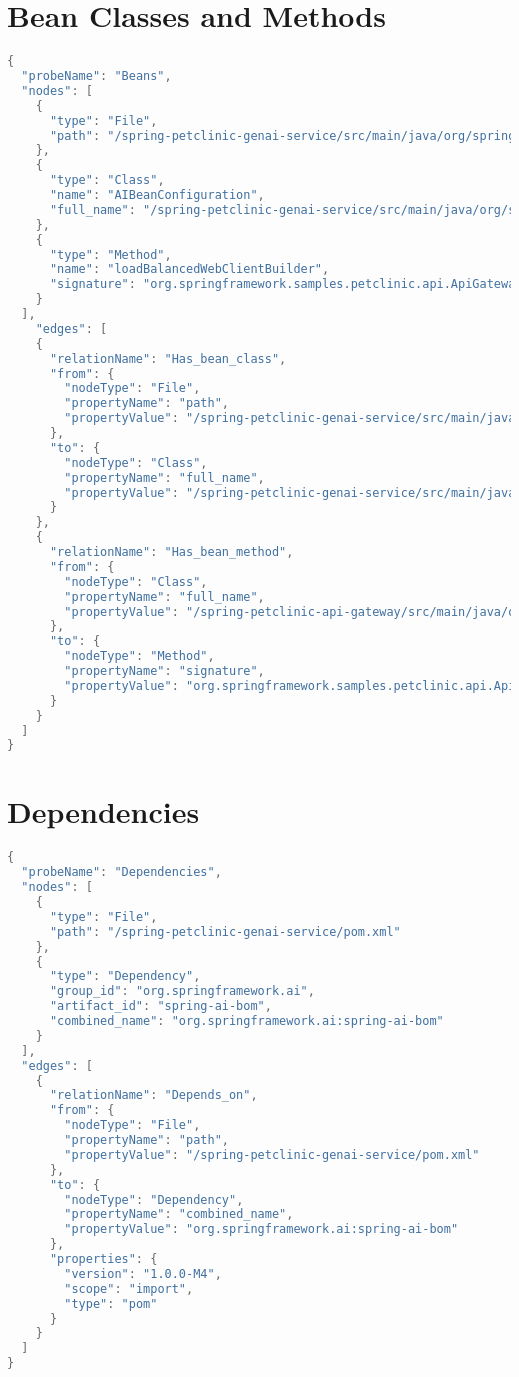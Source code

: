 \section{Bean Classes and Methods}\label{appendix_sec:bean_classes_methods}
\begin{lstlisting}[language=java]
{
  "probeName": "Beans",
  "nodes": [
    {
      "type": "File",
      "path": "/spring-petclinic-genai-service/src/main/java/org/springframework/samples/petclinic/genai/AIBeanConfiguration.java"
    },
    {
      "type": "Class",
      "name": "AIBeanConfiguration",
      "full_name": "/spring-petclinic-genai-service/src/main/java/org/springframework/samples/petclinic/genai/AIBeanConfiguration.java:AIBeanConfiguration"
    },
    {
      "type": "Method",
      "name": "loadBalancedWebClientBuilder",
      "signature": "org.springframework.samples.petclinic.api.ApiGatewayApplication.loadBalancedWebClientBuilder()"
    }
  ],
    "edges": [
    {
      "relationName": "Has_bean_class",
      "from": {
        "nodeType": "File",
        "propertyName": "path",
        "propertyValue": "/spring-petclinic-genai-service/src/main/java/org/springframework/samples/petclinic/genai/AIBeanConfiguration.java"
      },
      "to": {
        "nodeType": "Class",
        "propertyName": "full_name",
        "propertyValue": "/spring-petclinic-genai-service/src/main/java/org/springframework/samples/petclinic/genai/AIBeanConfiguration.java:AIBeanConfiguration"
      }
    },
    {
      "relationName": "Has_bean_method",
      "from": {
        "nodeType": "Class",
        "propertyName": "full_name",
        "propertyValue": "/spring-petclinic-api-gateway/src/main/java/org/springframework/samples/petclinic/api/ApiGatewayApplication.java:ApiGatewayApplication"
      },
      "to": {
        "nodeType": "Method",
        "propertyName": "signature",
        "propertyValue": "org.springframework.samples.petclinic.api.ApiGatewayApplication.loadBalancedWebClientBuilder()"
      }
    }
  ]
}
\end{lstlisting}

\section{Dependencies}\label{appendix_sec:dependencies}
\begin{lstlisting}[language=java]
{
  "probeName": "Dependencies",
  "nodes": [
    {
      "type": "File",
      "path": "/spring-petclinic-genai-service/pom.xml"
    },
    {
      "type": "Dependency",
      "group_id": "org.springframework.ai",
      "artifact_id": "spring-ai-bom",
      "combined_name": "org.springframework.ai:spring-ai-bom"
    }
  ],
  "edges": [
    {
      "relationName": "Depends_on",
      "from": {
        "nodeType": "File",
        "propertyName": "path",
        "propertyValue": "/spring-petclinic-genai-service/pom.xml"
      },
      "to": {
        "nodeType": "Dependency",
        "propertyName": "combined_name",
        "propertyValue": "org.springframework.ai:spring-ai-bom"
      },
      "properties": {
        "version": "1.0.0-M4",
        "scope": "import",
        "type": "pom"
      }
    }
  ]
}
\end{lstlisting}

